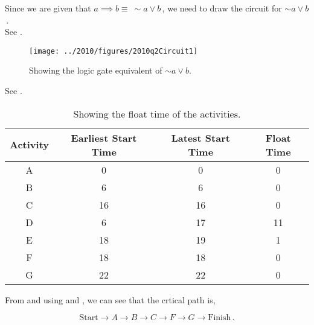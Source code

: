 \begin{subquestions}
\subquestion

Since we are given that $a \implies b \equiv ~\sim a \lor b$\,, we need to draw the circuit for $\sim a \lor b$\,. \\
See .

\begin{figure}
	\begin{center}
		\texttt{[image: ../2010/figures/2010q2Circuit1]}
		\caption{\label{2010:q2:fig:Circuit1} Showing the logic gate equivalent of $\sim a \lor b$.}
	\end{center}
\end{figure}

\subquestion

\begin{subsubquestions}
	
\subsubquestion

See .

\begin{table}[ht]
	\centering
	\begin{tabular}{|c|c|c|c|}
		\hline
		Activity & Earliest Start Time & Latest Start Time & Float Time \\
		\hline
		A & 0 & 0 & 0 \\
		B & 6 & 6 & 0 \\
		C & 16 & 16 & 0 \\
		D & 6 & 17 & 11 \\
		E & 18 & 19 & 1 \\
		F & 18 & 18 & 0 \\
		G & 22 & 22 & 0 \\
		\hline
	\end{tabular}
	\caption{\label{2011:q2:tab:CritPath} Showing the float time of the activities.}
\end{table}

\subsubquestion

From  and using  and , we can see that the crtical path is,

\begin{equation}
	\text{Start} \rightarrow A \rightarrow B \rightarrow C \rightarrow F \rightarrow G \rightarrow \text{Finish}\,.
\end{equation}

\end{subsubquestions}

\end{subquestions}


